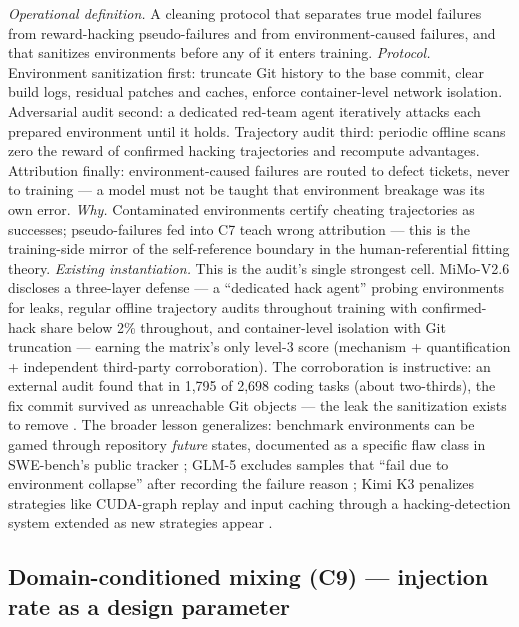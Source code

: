 \documentclass[10pt]{article}
\begin{document}
\emph{Operational definition.} A cleaning protocol that separates true model failures from reward-hacking pseudo-failures and from environment-caused failures, and that sanitizes environments before any of it enters training. \emph{Protocol.} Environment sanitization first: truncate Git history to the base commit, clear build logs, residual patches and caches, enforce container-level network isolation. Adversarial audit second: a dedicated red-team agent iteratively attacks each prepared environment until it holds. Trajectory audit third: periodic offline scans zero the reward of confirmed hacking trajectories and recompute advantages. Attribution finally: environment-caused failures are routed to defect tickets, never to training --- a model must not be taught that environment breakage was its own error. \emph{Why.} Contaminated environments certify cheating trajectories as successes; pseudo-failures fed into C7 teach wrong attribution --- this is the training-side mirror of the self-reference boundary in the human-referential fitting theory. \emph{Existing instantiation.} This is the audit's single strongest cell. MiMo-V2.6 discloses a three-layer defense --- a ``dedicated hack agent'' probing environments for leaks, regular offline trajectory audits throughout training with confirmed-hack share below 2\% throughout, and container-level isolation with Git truncation \cite{ref26} --- earning the matrix's only level-3 score (mechanism + quantification + independent third-party corroboration). The corroboration is instructive: an external audit found that in 1,795 of 2,698 coding tasks (about two-thirds), the fix commit survived as unreachable Git objects --- the leak the sanitization exists to remove \cite{ref29}. The broader lesson generalizes: benchmark environments can be gamed through repository \emph{future} states, documented as a specific flaw class in SWE-bench's public tracker \cite{ref30}; GLM-5 excludes samples that ``fail due to environment collapse'' after recording the failure reason \cite{ref27}; Kimi K3 penalizes strategies like CUDA-graph replay and input caching through a hacking-detection system extended as new strategies appear \cite{ref31}.

\subsection{Domain-conditioned mixing (C9) --- injection rate as a design parameter}
\end{document}
